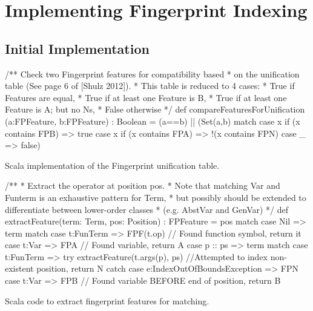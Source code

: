 
\chapter{Implementing Fingerprint Indexing}
\label{cha:method}

\section{Initial Implementation}
\label{sec:initial}


\begin{listing}[H]
\begin{scalacode}
 /** Check two Fingerprint features for compatibility based
   * on the unification table (See page 6 of [Shulz 2012]).
   * This table is reduced to 4 cases:
   *   True if Features are equal,
   *   True if at least one Feature is B,
   *   True if at least one Feature is A; but no Ns,
   *   False otherwise  */
  def compareFeaturesForUnification
         (a:FPFeature, b:FPFeature) : Boolean =
  (a==b) || 
  (Set(a,b) match {
    case x if (x contains FPB) => true
    case x if (x contains FPA) => !(x contains FPN)
    case _ => false})
\end{scalacode}
\caption{Scala implementation of the Fingerprint unification table. \protect\cite[p6]{shulz12}}
\label{lst:unitable}
\end{listing}

\begin{listing}[H]
\begin{scalacode}
  /** 
   * Extract the operator at position pos.
   * Note that matching Var and Funterm is an exhaustive pattern for Term,
   * but possibly should be extended to differentiate between lower-order classes
   * (e.g. AbstVar and GenVar)
   */
  def extractFeature(term: Term, pos: Position) : FPFeature = 
        pos match {
    case Nil => term match {
      case t:FunTerm => FPF(t.op) // Found function symbol, return it
      case t:Var     => FPA       // Found variable, return A
    }
    case p :: ps => term match {
      case t:FunTerm => try   {extractFeature(t.args(p), ps) }
                        //Attempted to index non-existent position, return N
      					catch {case e:IndexOutOfBoundsException => FPN}
      case t:Var     => FPB // Found variable BEFORE end of position, return B
    }
  }
\end{scalacode}
\caption{Scala code to extract fingerprint features for matching.}
\label{lst:posextract}
\end{listing}

